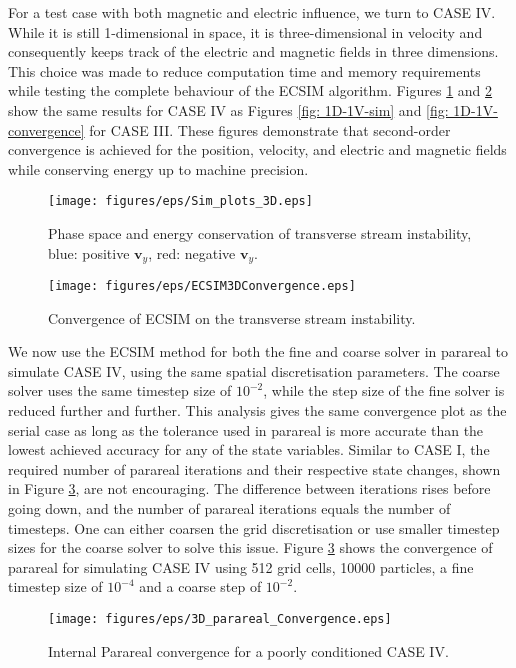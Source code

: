 For a test case with both magnetic and electric influence, we turn to CASE IV. While it is still 1-dimensional in space, it is three-dimensional in velocity and consequently keeps track of the electric and magnetic fields in three dimensions. This choice was made to reduce computation time and memory requirements while testing the complete behaviour of the ECSIM algorithm. Figures \ref{fig: 1D-3V-sim} and \ref{fig: 1D-3V-convergence} show the same results for CASE IV as Figures \ref{fig: 1D-1V-sim} and \ref{fig: 1D-1V-convergence} for CASE III. These figures demonstrate that second-order convergence is achieved for the position, velocity, and electric and magnetic fields while conserving energy up to machine precision.
\begin{figure}[h]
    \centering
    \texttt{[image: figures/eps/Sim\_plots\_3D.eps]}
    \caption{Phase space and energy conservation of transverse stream instability, blue: positive $\textbf{v}_y$, red: negative $\textbf{v}_y$.}
    \label{fig: 1D-3V-sim}
\end{figure}
\begin{figure}[h]
    \centering
    \texttt{[image: figures/eps/ECSIM3DConvergence.eps]}
    \caption{Convergence of ECSIM on the transverse stream instability.}
    \label{fig: 1D-3V-convergence}
\end{figure}
\newline
We now use the ECSIM method for both the fine and coarse solver in parareal to simulate CASE IV, using the same spatial discretisation parameters. The coarse solver uses the same timestep size of $10^{-2}$, while the step size of the fine solver is reduced further and further. This analysis gives the same convergence plot as the serial case as long as the tolerance used in parareal is more accurate than the lowest achieved accuracy for any of the state variables. Similar to CASE I, the required number of parareal iterations and their respective state changes, shown in Figure \ref{fig: 1D-3V-parareal-convergence}, are not encouraging. The difference between iterations rises before going down, and the number of parareal iterations equals the number of timesteps. One can either coarsen the grid discretisation or use smaller timestep sizes for the coarse solver to solve this issue. 
Figure \ref{fig: 1D-3V-parareal-convergence} shows the convergence of parareal for simulating CASE IV using 512 grid cells, 10000 particles, a fine timestep size of $10^{-4}$ and a coarse step of $10^{-2}$. 
\begin{figure}[h]
    \centering
    \texttt{[image: figures/eps/3D\_parareal\_Convergence.eps]}
    \caption{Internal Parareal convergence for a poorly conditioned CASE IV.}
    \label{fig: 1D-3V-parareal-convergence}
\end{figure}
